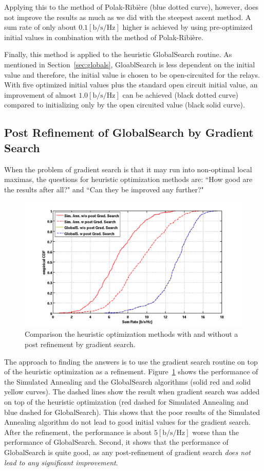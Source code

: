 Applying this to the method of Polak-Ribi\`{e}re (blue dotted curve), however, does not improve the results as much as we did with the steepest ascent method.
A sum rate of only about $0.1 \left[\text{b/s/Hz}\right]$ higher is achieved by using pre-optimized initial values in combination with the method of Polak-Ribi\`{e}re.

Finally, this method is applied to the heuristic GlobalSearch routine.
As mentioned in Section~\ref{sec:globals}, GloablSearch is less dependent on the initial value and therefore, the initial value is chosen to be open-circuited for the relays.
With five optimized initial values plus the standard open circuit initial value, an improvement of almost $1.0 \left[\text{b/s/Hz}\right]$ can be achieved (black dotted curve) compared to initializing only by the open circuited value (black solid curve).


\subsection{Post Refinement of GlobalSearch by Gradient Search}
\label{sec:postrefinement}
When the problem of gradient search is that it may run into non-optimal local maximas, the questions for heuristic optimization methods are: ``How good are the results after all?" and ``Can they be improved any further?"
\begin{figure}[h]
\centering
  \includegraphics[width=0.9\linewidth]{images/Postrefinementcomparison.png}
\caption{Comparison the heuristic optimization methods with and without a post refinement by gradient search.}
\label{fig:postrefinement}
\end{figure}

The approach to finding the answers is to use the gradient search routine on top of the heuristic optimization as a refinement.
Figure~\ref{fig:postrefinement} shows the performance of the Simulated Annealing and the GlobalSearch algorithms (solid red and solid yellow curves).
The dashed lines show the result when gradient search was added on top of the heuristic optimization (red dashed for Simulated Annealing and blue dashed for GlobalSearch).
This shows that the poor results of the Simulated Annealing algorithm do not lead to good initial values for the gradient search.
After the refinement, the performance is about $5 \left[\text{b/s/Hz}\right]$ worse than the performance of GlobalSearch.
Second, it shows that the performance of GlobalSearch is quite good, as any post-refinement of gradient search \emph{does not lead to any significant improvement}.


